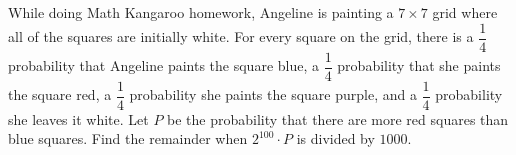 While doing Math Kangaroo homework, Angeline is painting a $7\times 7$ grid where all of the squares are initially white. For every square on the grid, there is a $\dfrac{1}{4}$ probability that Angeline paints the square blue, a $\dfrac{1}{4}$ probability that she paints the square red, a $\dfrac{1}{4}$ probability she paints the square purple, and a $\dfrac{1}{4}$ probability she leaves it white. Let $P$ be the probability that there are more red squares than blue squares. Find the remainder when $2^{100}\cdot P$ is divided by $1000$.
